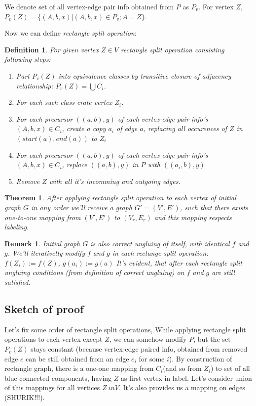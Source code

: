 \documentclass[12pt,a4paper,oneside]{article}
\newtheorem{theorem}{Theorem}
\newtheorem{definition}{Definition}
\newtheorem{remark}{Remark}
\begin{document}
We denote set of all vertex-edge pair info obtained from $P$ as $P_v$.
For vertex $Z$, $P_v(Z) = \{(A, b, x)|(A, b, x) \in P_v; A = Z\}$.
 
Now we can define \emph{rectangle split operation}:
\begin{definition}
For given vertex $Z \in V$ rectangle split operation consisting following steps:
\begin{enumerate}
\item Part $P_v(Z)$ into equivalence classes by transitive closure of adjacency relationship: $P_v(Z) = \bigcup C_i$. 
\item For each such class crate vertex $Z_i$.
\item For each precursor $((a, b), y)$ of each vertex-edge pair info's $(A, b, x) \in C_i$,  create a copy $a_i$ of edge $a$, replacing all occurences of $Z$ in $(start(a), end(a))$ to $Z_i$  
\item For each precursor $((a, b), y)$ of each vertex-edge pair info's $(A, b, x) \in C_i$, replace $((a, b), y)$ in $P$ with $((a_i, b), y)$
\item Remove $Z$ with all it's incomming and outgoing edges.
\end{enumerate} 
\end{definition} 
\begin{theorem}
  After applying rectangle split operation to each vertex of initial graph $G$ in any order we'll receive a graph $G' = (V', E')$, such that there exists one-to-one mapping from $(V', E')$ to $(V_r, E_r)$ and this mapping respects labeling.
\end{theorem}
\begin{remark}
 Initial graph $G$ is also correct ungluing of itself, with identical $f$ and $g$. We'll iterativelly modify $f$ and $g$ in each rectange split operation:
$f(Z_i):= f(Z)$, $g(a_i):= g(a)$
 It's evident, that after each rectangle split ungluing conditions (from definition of correct ungluing) on $f$ and $g$ are still satisfied.

\end{remark}

\subsection{Sketch of proof}
Let's fix some order of rectangle split operations,
While applying rectangle split operations to each vertex except $Z$, we can somehow modify $P$, but the set $P_v(Z)$ stays constant (because vertex-edge paired info, obtained from removed edge $e$ can be still obtained from an edge $e_i$ for some $i$). By construction of rectangle graph, there is a one-one mapping from $C_i$(and so from $Z_i$) to set of all blue-connected components, having $Z$ as first vertex in label. Let's consider union of this mappings for all vertices $Z \ in V$. It's also provides us a mapping on edges (SHURIK!!!). 
\end{document}
